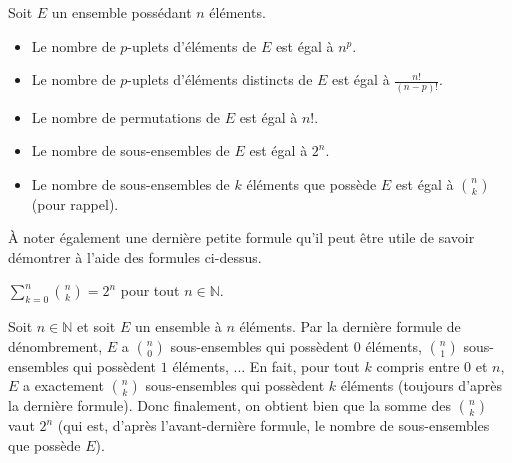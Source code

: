 	\begin{formula}[Formules]
		Soit $E$ un ensemble possédant $n$ éléments.
		\begin{itemize}
			\item Le nombre de $p$-uplets d'éléments de $E$ est égal à $n^p$.
			\item Le nombre de $p$-uplets d'éléments distincts de $E$ est égal à $\frac{n!}{(n-p)!}$.
			\item Le nombre de permutations de $E$ est égal à $n!$.
			\item Le nombre de sous-ensembles de $E$ est égal à $2^n$.
			\item Le nombre de sous-ensembles de $k$ éléments que possède $E$ est égal à $\displaystyle{\binom{n}{k}}$ (pour rappel).
		\end{itemize}
	\end{formula}
	
	\begin{nosummary}
		À noter également une dernière petite formule qu'il peut être utile de savoir démontrer à l'aide des formules ci-dessus.
		
		\begin{formula}
			$\displaystyle{\sum_{k = 0}^n \binom{n}{k} = 2^n}$ pour tout $n \in \mathbb{N}$.
		\end{formula}
		
		\begin{demonstration}
			Soit $n \in \mathbb{N}$ et soit $E$ un ensemble à $n$ éléments.
			\newpar
			Par la dernière formule de dénombrement, $E$ a $\displaystyle{\binom{n}{0}}$ sous-ensembles qui possèdent $0$ éléments, $\displaystyle{\binom{n}{1}}$ sous-ensembles qui possèdent $1$ éléments, ...
			\newpar
			En fait, pour tout $k$ compris entre $0$ et $n$, $E$ a exactement $\displaystyle{\binom{n}{k}}$ sous-ensembles qui possèdent $k$ éléments (toujours d'après la dernière formule).
			\newpar
			Donc finalement, on obtient bien que la somme des $\displaystyle{\binom{n}{k}}$ vaut $2^n$ (qui est, d'après l'avant-dernière formule, le nombre de sous-ensembles que possède $E$).
		\end{demonstration}
	\end{nosummary}
